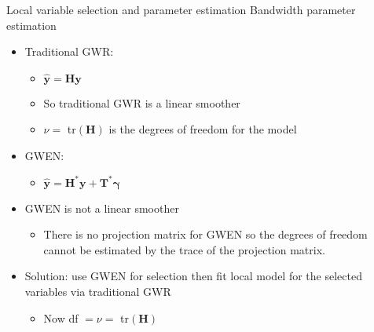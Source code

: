 \documentclass[12pt,t]{beamer}
\newcommand{\subt}[1]{{\footnotesize \color{subtitle} {#1}}}
\begin{document}
\begin{comment}
\begin{frame}{Local variable selection and  parameter estimation}
\subt{Bandwidth parameter estimation}

\bigskip
Letting $H_i = \bm{W}_i \bm{X}\left(\bm{X}'\bm{W}_i\bm{X}\right)^{-1}\bm{X}'$, where $\bm{W}_i$ is the diagonal weight matrix diag$(w_{ii'})$,
 
\begin{align*}
  \hat{\bm{y}} = \bm{H} \bm{y}
\end{align*}

\note{note}
\end{frame}
\end{comment}



\begin{frame}{Local variable selection and  parameter estimation}
\subt{Bandwidth parameter estimation}

\bigskip 
\begin{itemize}
  \item Traditional GWR:
  \begin{itemize}
    \item $\hat{\bm{y}} = \bm{H} \bm{y}$
    \item So traditional GWR is a linear smoother
    \item $\nu = $ tr$(\bm{H})$ is the degrees of freedom for the model
  \end{itemize}

  \item GWEN:
  \begin{itemize}
    \item $\hat{\bm{y}} = \bm{H}^{*}\bm{y} + \bm{T}^{*}\bm{\gamma}$
  \end{itemize}  
  \item GWEN is not a linear smoother
  \begin{itemize}
    \item There is no projection matrix for GWEN so the degrees of freedom cannot be estimated by the trace of the projection matrix.
  \end{itemize} 
  \item Solution: use GWEN for selection then fit local model for the selected variables via traditional GWR
  \begin{itemize}
    \item Now df $= \nu = $ tr$(\bm{H})$
  \end{itemize} 
\end{itemize}


\end{frame}
\end{document}
